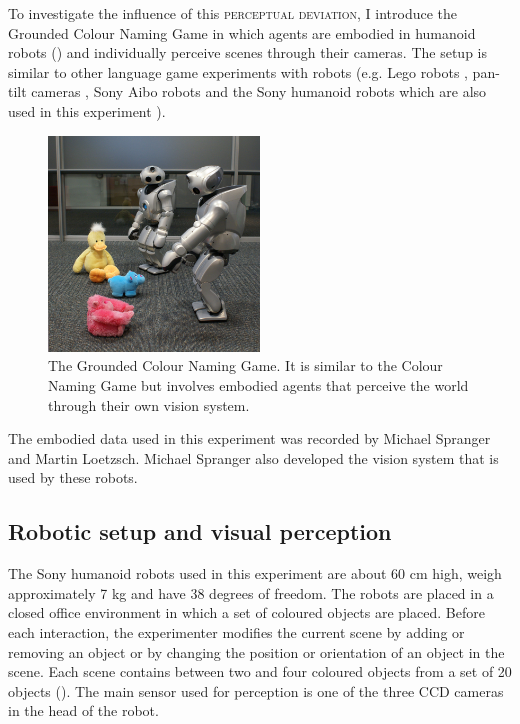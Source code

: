 To investigate the influence of this \textsc{perceptual deviation}, I
introduce the Ground\-ed Colour Naming Game in which agents are
embodied in humanoid robots () and individually perceive scenes
through their cameras. The setup is similar to other language game
experiments with robots (e.g. Lego robots \citep{vogt03anchoring},
pan-tilt cameras \citep{steels98origins}, Sony Aibo robots
\citep{steels09perspective, loetzsch08typological} and the Sony
humanoid robots which are also used in this experiment
\citep{wellens08flexible}).

\begin{figure}[htpb]
  \centerline{\includegraphics[width=0.5\textwidth]{./experiments/figures/grounding-cng-small}}
  \caption[The Grounded Colour Naming Game]{The Grounded Colour
      Naming Game. It is similar to the Colour Naming Game but
    involves embodied agents that perceive the world through their own
    vision system.}
\label{f:grounded-colour-naming-game}
\end{figure}

The embodied data used in this experiment was recorded by Michael
Spranger and Martin Loetzsch. Michael Spranger also developed the
vision system that is used by these robots.

\subsection{Robotic setup and visual perception}

The Sony humanoid robots \citep{fujita03autonomous} used in this
experiment are about 60 cm high, weigh approximately 7 kg and have 38
degrees of freedom. The robots are placed in a closed office
environment in which a set of coloured objects are placed. Before each
interaction, the experimenter modifies the current scene by adding or
removing an object or by changing the position or orientation of an
object in the scene. Each scene contains between two and four coloured
objects from a set of 20 objects (). The
main sensor used for perception is one of the three CCD cameras in the
head of the robot.


